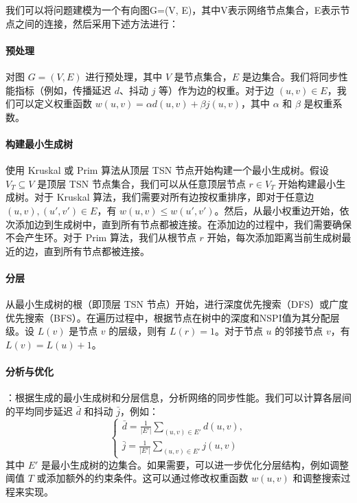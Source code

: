 \documentclass[UTF8,a4paper,12pt]{ctexart}
\numberwithin{equation}{section}
\begin{document}
我们可以将问题建模为一个有向图G=(V, E)，其中V表示网络节点集合，E表示节点之间的连接，然后采用下述方法进行：
\paragraph{预处理}对图 $G=(V,E)$ 进行预处理，其中 $V$ 是节点集合，$E$ 是边集合。我们将同步性能指标（例如，传播延迟 $d$、抖动 $j$ 等）作为边的权重。对于边 $(u, v) \in E$，我们可以定义权重函数 $w(u, v) = \alpha d(u, v) + \beta j(u, v)$，其中 $\alpha$ 和 $\beta$ 是权重系数。

\paragraph{构建最小生成树}使用 Kruskal 或 Prim 算法从顶层 TSN 节点开始构建一个最小生成树。假设 $V_T \subseteq V$ 是顶层 TSN 节点集合，我们可以从任意顶层节点 $r \in V_T$ 开始构建最小生成树。对于 Kruskal 算法，我们需要对所有边按权重排序，即对于任意边 $(u, v), (u', v') \in E$，有 $w(u, v) \le w(u', v')$。然后，从最小权重边开始，依次添加边到生成树中，直到所有节点都被连接。在添加边的过程中，我们需要确保不会产生环。对于 Prim 算法，我们从根节点 $r$ 开始，每次添加距离当前生成树最近的边，直到所有节点都被连接。

\paragraph{分层}从最小生成树的根（即顶层 TSN 节点）开始，进行深度优先搜索（DFS）或广度优先搜索（BFS）。在遍历过程中，根据节点在树中的深度和NSPI值为其分配层级。设 $L(v)$ 是节点 $v$ 的层级，则有 $L(r) = 1$。对于节点 $u$ 的邻接节点 $v$，有 $L(v) = L(u) + 1$。

\paragraph{分析与优化}：根据生成的最小生成树和分层信息，分析网络的同步性能。我们可以计算各层间的平均同步延迟 $\bar{d}$ 和抖动 $\bar{j}$，例如：
\begin{equation}
	\left\{
	\begin{aligned}
			\bar{d} = \frac{1}{\lvert E' \rvert} \sum_{(u,v) \in E'} d(u,v),\\
		\bar{j} = \frac{1}{\lvert E' \rvert} \sum_{(u,v) \in E'} j(u,v)
	\end{aligned}
	\right.
\end{equation}
其中 $E'$ 是最小生成树的边集合。如果需要，可以进一步优化分层结构，例如调整阈值 $T$ 或添加额外的约束条件。这可以通过修改权重函数 $w(u, v)$ 和调整搜索过程来实现。
\end{document}
